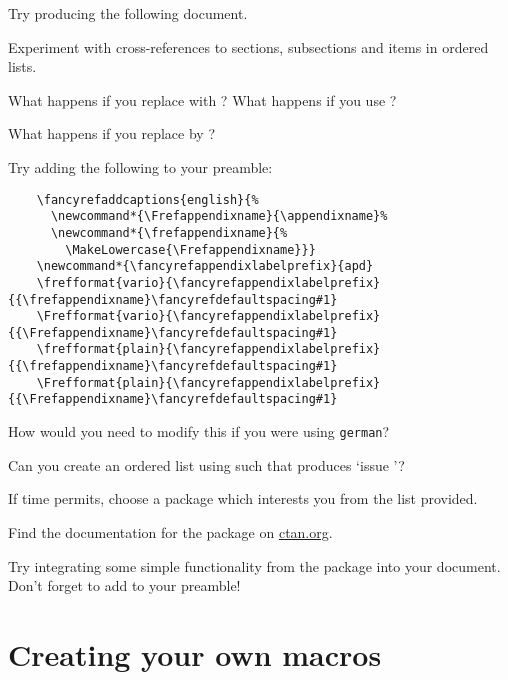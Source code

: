 \begin{exercise}
  Try producing the following document.
  

  Experiment with  cross-references to sections, subsections and items in ordered lists.

  What happens if you replace  with ?
  What happens if you use ?

  What happens if you replace  by ?

  Try adding the following to your preamble:
  \begin{verbatim}
	\fancyrefaddcaptions{english}{%
	  \newcommand*{\Frefappendixname}{\appendixname}%
	  \newcommand*{\frefappendixname}{%
		\MakeLowercase{\Frefappendixname}}}
	\newcommand*{\fancyrefappendixlabelprefix}{apd}
	\frefformat{vario}{\fancyrefappendixlabelprefix}{{\frefappendixname}\fancyrefdefaultspacing#1}
	\Frefformat{vario}{\fancyrefappendixlabelprefix}{{\Frefappendixname}\fancyrefdefaultspacing#1}
	\frefformat{plain}{\fancyrefappendixlabelprefix}{{\frefappendixname}\fancyrefdefaultspacing#1}
	\Frefformat{plain}{\fancyrefappendixlabelprefix}{{\Frefappendixname}\fancyrefdefaultspacing#1}
  \end{verbatim}

  How would you need to modify this if you were using \verb|german|?

  Can you create an ordered list using  such that  produces ‘issue ’?

\end{exercise}

\begin{exercise}
  If time permits, choose a package which interests you from the list provided.

  Find the documentation for the package on \url{ctan.org}.

  Try integrating some simple functionality from the package into your document.
  Don't forget to add  to your preamble!
\end{exercise}


\section{Creating your own macros}


